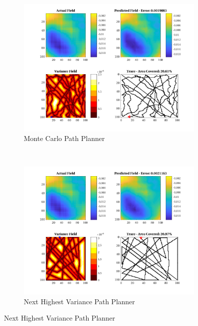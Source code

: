\begin{figure}[htb!]
    \centering
    \begin{subfigure}[t]{0.5\textwidth}
        \centering
        \includegraphics[width=\linewidth]{figures/hbresults/mc_20p_100x100_sf_25_seed_2.png}
        \captionsetup{skip=0.10\baselineskip,size=footnotesize}
        \caption{Monte Carlo Path Planner}
    \end{subfigure}%
    ~ 
    \begin{subfigure}[t]{0.5\textwidth}
        \centering
        \includegraphics[width=\linewidth]{figures/hbresults/nhv_20p_100x100_sf_25_seed_2.png}
        \captionsetup{skip=0.10\baselineskip,size=footnotesize}
        \caption{Next Highest Variance Path Planner}

\end{subfigure}
\end{figure}
